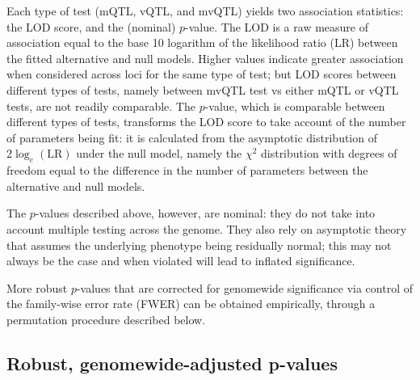 Each type of test (mQTL, vQTL, and mvQTL) yields two association statistics: the LOD score, and the (nominal) $p$-value.
The LOD is a raw measure of association equal to the base 10 logarithm of the likelihood ratio (LR) between the fitted alternative and null models.
Higher values indicate greater association when considered across loci for the same type of test; but LOD scores between different types of tests, namely between mvQTL test vs either mQTL or vQTL tests, are not readily comparable.
The $p$-value, which is comparable between different types of tests, transforms the LOD score to take account of the number of parameters being fit: it is calculated from the asymptotic distribution of $2\log_e\left(\text{LR}\right)$ under the null model, namely the $\chi^2$ distribution with degrees of freedom equal to the difference in the number of parameters between the alternative and null models.

The $p$-values described above, however, are nominal: they do not take into account multiple testing across the genome.
    They also rely on asymptotic theory that assumes the underlying phenotype being residually normal; this may not always be the case and when violated will lead to inflated significance.

More robust $p$-values that are corrected for genomewide significance via control of the family-wise error rate (FWER) can be obtained empirically, through a permutation procedure described below.

\subsection{Robust, genomewide-adjusted p-values}

